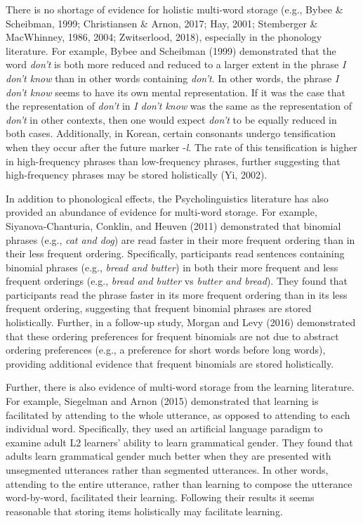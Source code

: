 \documentclass[
  man,floatsintext]{apa6}
\begin{document}
There is no shortage of evidence for holistic multi-word storage (e.g., Bybee \& Scheibman, 1999; Christiansen \& Arnon, 2017; Hay, 2001; Stemberger \& MacWhinney, 1986, 2004; Zwitserlood, 2018), especially in the phonology literature. For example, Bybee and Scheibman (1999) demonstrated that the word \emph{don't} is both more reduced and reduced to a larger extent in the phrase \emph{I don't know} than in other words containing \emph{don't}. In other words, the phrase \emph{I don't know} seems to have its own mental representation. If it was the case that the representation of \emph{don't} in \emph{I don't know} was the same as the representation of \emph{don't} in other contexts, then one would expect \emph{don't} to be equally reduced in both cases. Additionally, in Korean, certain consonants undergo tensification when they occur after the future marker -\emph{l}. The rate of this tensification is higher in high-frequency phrases than low-frequency phrases, further suggesting that high-frequency phrases may be stored holistically (Yi, 2002).

In addition to phonological effects, the Psycholinguistics literature has also provided an abundance of evidence for multi-word storage. For example, Siyanova-Chanturia, Conklin, and Heuven (2011) demonstrated that binomial phrases (e.g., \emph{cat and dog}) are read faster in their more frequent ordering than in their less frequent ordering. Specifically, participants read sentences containing binomial phrases (e.g., \emph{bread and butter}) in both their more frequent and less frequent orderings (e.g., \emph{bread and butter} vs \emph{butter and bread}). They found that participants read the phrase faster in its more frequent ordering than in its less frequent ordering, suggesting that frequent binomial phrases are stored holistically. Further, in a follow-up study, Morgan and Levy (2016) demonstrated that these ordering preferences for frequent binomials are not due to abstract ordering preferences (e.g., a preference for short words before long words), providing additional evidence that frequent binomials are stored holistically.

Further, there is also evidence of multi-word storage from the learning literature. For example, Siegelman and Arnon (2015) demonstrated that learning is facilitated by attending to the whole utterance, as opposed to attending to each individual word. Specifically, they used an artificial language paradigm to examine adult L2 learners' ability to learn grammatical gender. They found that adults learn grammatical gender much better when they are presented with unsegmented utterances rather than segmented utterances. In other words, attending to the entire utterance, rather than learning to compose the utterance word-by-word, facilitated their learning. Following their results it seems reasonable that storing items holistically may facilitate learning.
\end{document}
